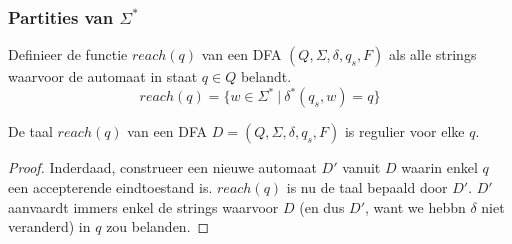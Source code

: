\documentclass[main.tex]{subfiles}
\begin{document}
\subsubsection{Partities van $\Sigma^{*}$}
\label{sec:partities-van-sigma-ster}

\begin{de}
  Definieer de functie $reach(q)$ van een DFA $(Q,\Sigma,\delta,q_{s},F)$ als alle strings waarvoor de automaat in staat $q\in Q$ belandt.
  \[
  reach(q) = \{ w \in \Sigma^{*}\ |\ \delta^{*}(q_{s},w) = q \}
  \]
\end{de}

\begin{st}
  De taal $reach(q)$ van een DFA $D = (Q,\Sigma,\delta,q_{s},F)$ is regulier voor elke $q$.
  
  \begin{proof}
    Inderdaad, construeer een nieuwe automaat $D'$ vanuit $D$ waarin enkel $q$ een accepterende eindtoestand is.
    $reach(q)$ is nu de taal bepaald door $D'$. $D'$ aanvaardt immers enkel de strings waarvoor $D$ (en dus $D'$, want we hebbn $\delta$ niet veranderd) in $q$ zou belanden.
  \end{proof}
\end{st}
\end{document}
